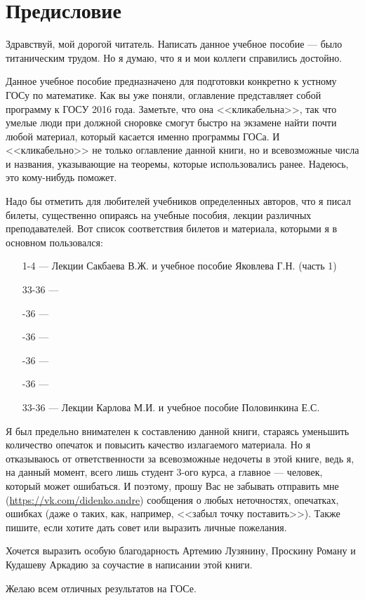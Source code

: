 \chapter{Предисловие}
Здравствуй, мой дорогой читатель. Написать данное учебное пособие --- было титаническим трудом. Но я думаю, что я и мои коллеги справились достойно.

Данное учебное пособие предназначено для подготовки конкретно к устному ГОСу по математике. Как вы уже поняли, оглавление представляет собой программу к ГОСУ 2016 года. Заметьте, что она <<кликабельна>>, так что умелые люди при должной сноровке смогут быстро на экзамене найти почти любой материал, который касается именно программы ГОСа. И <<кликабельно>> не только оглавление данной книги, но и всевозможные числа и названия, указывающие на теоремы, которые использовались ранее. Надеюсь, это кому-нибудь поможет. 

Надо бы отметить для любителей учебников определенных авторов, что я писал билеты, существенно опираясь на учебные пособия, лекции различных преподавателей. Вот список соответствия билетов и материала, которыми я в основном пользовался:
\begin{itemize}
\item[1-4]
\; --- \: Лекции Сакбаева В.Ж. и учебное пособие Яковлева Г.Н. (часть 1)
\item[33-36]
\; --- \:
\item[\sffamily 33-36]
\; --- \:
\item[\sffamily 33-36]
\; --- \:
\item[\sffamily 33-36]
\; --- \:
\item[\sffamily 33-36]
\; --- \:
\item[33-36]
\; --- \: Лекции Карлова М.И. и учебное пособие Половинкина Е.С.
\end{itemize}

Я был предельно внимателен к составлению данной книги, стараясь уменьшить количество опечаток и повысить качество излагаемого материала. Но я отказываюсь от ответственности за всевозможные недочеты в этой книге, ведь я, на данный момент, всего лишь студент 3-ого курса, а главное --- человек, который может ошибаться. И поэтому, прошу Вас не забывать отправить мне (\url{https://vk.com/didenko.andre}) сообщения о любых неточностях, опечатках, ошибках (даже о таких, как, например, <<забыл точку поставить>>). Также пишите, если хотите дать совет или выразить личные пожелания. 

Хочется выразить особую благодарность Артемию Лузянину, Проскину Роману и Кудашеву Аркадию за соучастие в написании этой книги.
 
\vspace*{\baselineskip}
Желаю всем отличных результатов на ГОСе.